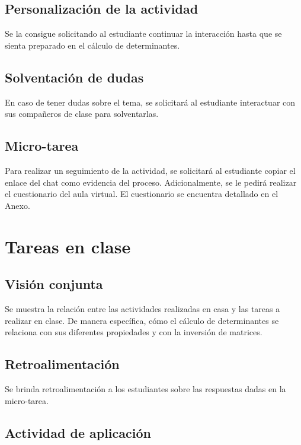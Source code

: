 \documentclass[a4,11pt]{aleph-notas}
\begin{document}
\subsection{Personalización de la actividad}

Se la consigue solicitando al estudiante continuar la interacción hasta que se sienta preparado en el cálculo de determinantes.

\subsection{Solventación de dudas}

En caso de tener dudas sobre el tema, se solicitará al estudiante interactuar con sus compañeros de clase para solventarlas.

\subsection{Micro-tarea}

Para realizar un seguimiento de la actividad, se solicitará al estudiante copiar el enlace del chat como evidencia del proceso. Adicionalmente, se le pedirá realizar el cuestionario del aula virtual. El cuestionario se encuentra detallado en el Anexo.

\section{Tareas en clase}

\subsection{Visión conjunta}

Se muestra la relación entre las actividades realizadas en casa y las tareas a realizar en clase. De manera específica, cómo el cálculo de determinantes se relaciona con sus diferentes propiedades y con la inversión de matrices.

\subsection{Retroalimentación}

Se brinda retroalimentación a los estudiantes sobre las respuestas dadas en la micro-tarea.

\subsection{Actividad de aplicación}
\end{document}
